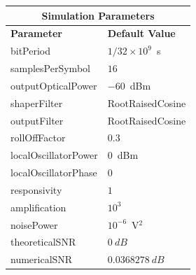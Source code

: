 \begin{refsection}
\begin{table}[H]
	\begin{tabular}{|l|l|}
		\hline
		\multicolumn{2}{|c|}{ \textbf{Simulation Parameters} } \\
		\hline
		\textbf{Parameter}     & \textbf{Default Value}                                     \\\hline
		bitPeriod              & $1/32\times10^9$~s														\\\hline
		samplesPerSymbol       & $16$                                                       \\\hline
		outputOpticalPower     & $-60$~dBm 													\\ \hline
		shaperFilter	       & RootRaisedCosine												\\ \hline
		outputFilter		   & RootRaisedCosine												\\ \hline
		rollOffFactor		   & 0.3														\\ \hline
		localOscillatorPower   & $0$~dBm                                                    \\ \hline
		localOscillatorPhase   & $0$                                                        \\ \hline
		responsivity           & $1$                                                        \\ \hline
		amplification          & $10^3$                                                     \\ \hline
		noisePower   & $10^{-6}$~V$^2$                             					\\ \hline
								theoreticalSNR  	   & $0~dB$                             					\\ \hline
		numericalSNR 		     & $0.0368278~dB$                             					\\ \hline

\end{tabular}
\end{table}
\end{refsection}
